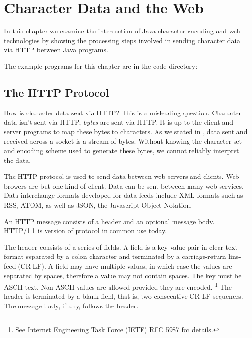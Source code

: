 \chapter{Character Data and the Web}\label{chap:web}

In this chapter we examine the intersection of Java character encoding 
and web technologies by showing the processing steps involved 
in sending character data via HTTP between Java programs.

The example programs for this chapter are in the code directory:
%
%

\section{The HTTP Protocol}\label{section:http}

How is character data sent via HTTP?
This is a misleading question.
Character data isn't sent via HTTP; \emph{bytes} are sent via HTTP.
It is up to the client and server programs to map these bytes to characters.
As we stated in ,
data sent and received across a socket is a stream of bytes.
Without knowing the character set and encoding scheme used to generate
these bytes, we cannot reliably interpret the data.

The HTTP protocol is used to send data between web servers and clients.
Web browers are but one kind of client.
Data can be sent between many web services.
Data interchange formats developed for data feeds include XML formats such as
RSS, ATOM, as well as JSON, the Javascript Object Notation.

An HTTP message consists of a header and an optional message body.
HTTP/1.1 is version of protocol in common use today.

The header consists of a series of fields.
A field is a key-value pair in clear text format separated by a colon character
and terminated by a carriage-return line-feed (CR-LF).
A field may have multiple values, in which case the values are separated by spaces,
therefore a value may not contain spaces.
The key must be ASCII text.
Non-ASCII values are allowed provided they are encoded.%
%
\footnote{See Internet Engineering Task Force (IETF) RFC 5987 for details.}
%
The header is terminated by a blank field, that is, two consecutive CR-LF sequences.
The message body, if any, follows the header.

